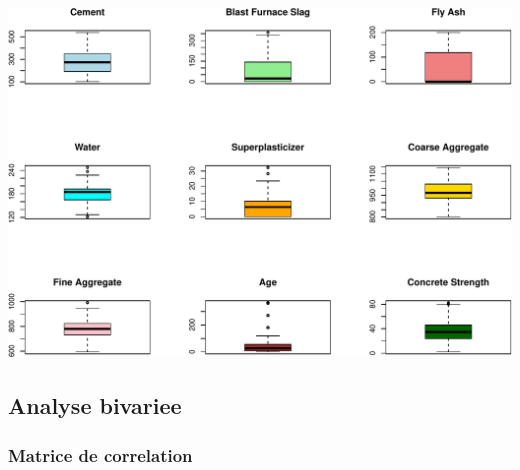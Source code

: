 \documentclass[
  12pt,
]{article}
\begin{document}
\includegraphics{rmd_final_files/figure-latex/boxplots_outliers-1.pdf}

\subsection{Analyse bivariee}\label{analyse-bivariee}

\subsubsection{Matrice de correlation}\label{matrice-de-correlation}
\end{document}
